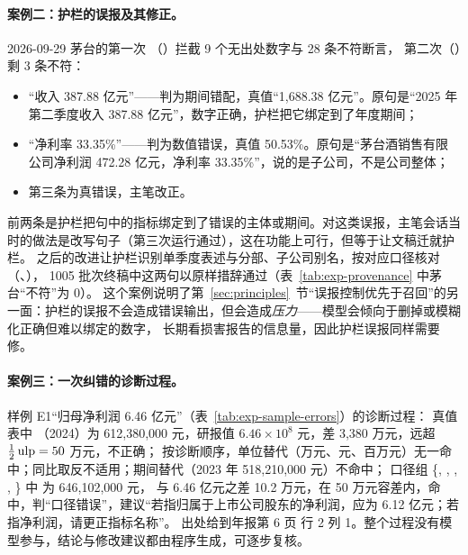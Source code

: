 \paragraph{案例二：护栏的误报及其修正。}2026-09-29 茅台的第一次 （）拦截 9 个无出处数字与 28 条不符断言，
第二次（）剩 3 条不符：
\begin{itemize}
  \item “收入 387.88 亿元”——判为期间错配，真值“1,688.38 亿元”。原句是“2025 年第二季度收入 387.88 亿元”，数字正确，护栏把它绑定到了年度期间；
  \item “净利率 33.35\%”——判为数值错误，真值 50.53\%。原句是“茅台酒销售有限公司净利润 472.28 亿元，净利率 33.35\%”，说的是子公司，不是公司整体；
  \item 第三条为真错误，主笔改正。
\end{itemize}
前两条是护栏把句中的指标绑定到了错误的主体或期间。对这类误报，主笔会话当时的做法是改写句子（第三次运行通过），这在功能上可行，但等于让文稿迁就护栏。
之后的改进让护栏识别单季度表述与分部、子公司别名，按对应口径核对（、），
1005 批次终稿中这两句以原样措辞通过（表~\ref{tab:exp-provenance} 中茅台“不符”为 0）。
这个案例说明了第~\ref{sec:principles}~节“误报控制优先于召回”的另一面：护栏的误报不会造成错误输出，但会造成\emph{压力}——模型会倾向于删掉或模糊化正确但难以绑定的数字，
长期看损害报告的信息量，因此护栏误报同样需要修。

\paragraph{案例三：一次纠错的诊断过程。}样例 E1“归母净利润 6.46 亿元”（表~\ref{tab:exp-sample-errors}）的诊断过程：
真值表中 （2024）为 612,380,000 元，研报值 $6.46\times10^8$ 元，差 3,380 万元，远超 $\tfrac12\operatorname{ulp}=50$ 万元，不正确；
按诊断顺序，单位替代（万元、元、百万元）无一命中；同比取反不适用；期间替代（2023 年 518,210,000 元）不命中；
口径组 \{, , , , \} 中  为 646,102,000 元，
与 6.46 亿元之差 10.2 万元，在 50 万元容差内，命中，判“口径错误”，建议“若指归属于上市公司股东的净利润，应为 6.12 亿元；若指净利润，请更正指标名称”。
出处给到年报第 6 页  行 2 列 1。整个过程没有模型参与，结论与修改建议都由程序生成，可逐步复核。

